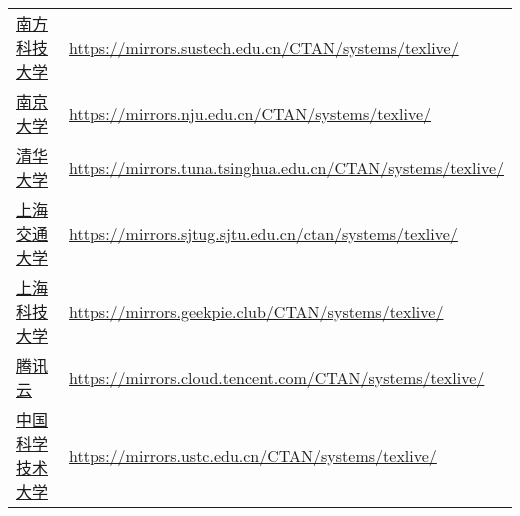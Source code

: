 \begin{table}[!hb]
\begin{tabular}{*{2}{l}}
      \href{https://mirrors.sustech.edu.cn/}{南方科技大学}
      & \url{https://mirrors.sustech.edu.cn/CTAN/systems/texlive/}\\
      \href{https://mirrors.nju.edu.cn/}{南京大学}
      & \url{https://mirrors.nju.edu.cn/CTAN/systems/texlive/}\\
      \href{https://mirrors.tuna.tsinghua.edu.cn/}{清华大学}
      & \url{https://mirrors.tuna.tsinghua.edu.cn/CTAN/systems/texlive/}\\
      \href{https://mirrors.sjtug.sjtu.edu.cn/}{上海交通大学}
      & \url{https://mirrors.sjtug.sjtu.edu.cn/ctan/systems/texlive/}\\
      \href{https://mirrors.geekpie.club/}{上海科技大学}
      & \url{https://mirrors.geekpie.club/CTAN/systems/texlive/}\\
      \href{https://mirrors.cloud.tencent.com/}{腾讯云}
      & \url{https://mirrors.cloud.tencent.com/CTAN/systems/texlive/}\\
      \href{https://mirrors.ustc.edu.cn/}{中国科学技术大学}
      & \url{https://mirrors.ustc.edu.cn/CTAN/systems/texlive/}\\
      \bottomrule
    \end{tabular}
\end{table}
